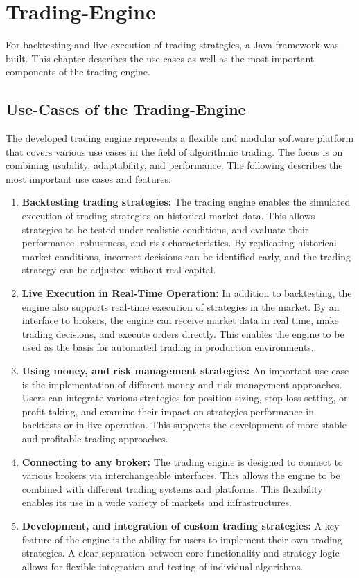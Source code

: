 \section{Trading-Engine}
\label{chap:te}

For backtesting and live execution of trading strategies, a Java framework was built.
This chapter describes the use cases as well as the most important components of the trading engine.

\subsection{Use-Cases of the Trading-Engine}
\label{chap:te-use-cases}

The developed trading engine represents a flexible and modular software platform that covers various use cases in the field of algorithmic trading.
The focus is on combining usability, adaptability, and performance.
The following describes the most important use cases and features:

\begin{enumerate}
    \item \textbf{Backtesting trading strategies:} The trading engine enables the simulated execution of trading strategies on historical market data.
    This allows strategies to be tested under realistic conditions, and evaluate their performance, robustness, and risk characteristics.
    By replicating historical market conditions, incorrect decisions can be identified early, and the trading strategy can be adjusted without real capital.
    \item \textbf{Live Execution in Real-Time Operation:} In addition to backtesting, the engine also supports real-time execution of strategies in the market.
    By an interface to brokers, the engine can receive market data in real time, make trading decisions, and execute orders directly.
    This enables the engine to be used as the basis for automated trading in production environments.
    \item \textbf{Using money, and risk management strategies:} An important use case is the implementation of different money and risk management approaches.
    Users can integrate various strategies for position sizing, stop-loss setting, or profit-taking, and examine their impact on strategies performance in backtests or in live operation.
    This supports the development of more stable and profitable trading approaches.
    \item \textbf{Connecting to any broker:} The trading engine is designed to connect to various brokers via interchangeable interfaces.
    This allows the engine to be combined with different trading systems and platforms.
    This flexibility enables its use in a wide variety of markets and infrastructures.
    \item \textbf{Development, and integration of custom trading strategies:} A key feature of the engine is the ability for users to implement their own trading strategies.
    A clear separation between core functionality and strategy logic allows for flexible integration and testing of individual algorithms.
\end{enumerate}

